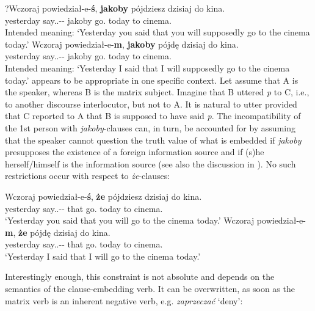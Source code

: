 \documentclass[output=paper
,modfonts
,nonflat]{langsci/langscibook}
\begin{document}
\ea \ea \gll	?Wczoraj powiedział-e-\textbf{ś}, \textbf{jakoby} pójdziesz dzisiaj do kina. \label{drugaosoba} \\
  			yesterday say.{\lptcp}.{\sg}-{\masc}-{\secondperson}{\sg} jakoby go.{\secondperson}{\sg} today to cinema.{\gen} \\
	\glt		Intended meaning: `Yesterday you said that  you will supposedly go to the cinema today.'
		\ex \gll	*Wczoraj powiedział-e-\textbf{m}, \textbf{jakoby} pójdę dzisiaj do kina. \label{pierwszy} \\
  			yesterday say.{\lptcp}.{\sg}-{\masc}-{\firstperson}{\sg} jakoby go.{\firstperson}{\sg} today to cinema.{\gen}\\
	\glt		Intended meaning: `Yesterday I said that I will supposedly go to the cinema today.'
\z\z
{} appears to be appropriate in one specific context. Let assume that A is the speaker, whereas B is the matrix subject. Imagine that B uttered \emph{p} to C, i.e., to another discourse interlocutor, but not to A. It is natural to utter  provided that C reported to A that B is supposed to have said \emph{p}. The incompatibility of the 1st person with \emph{jakoby}-clauses can, in turn, be accounted for by assuming that the speaker cannot question the truth value of what is embedded if \emph{jakoby} presupposes the existence of a foreign information source and if (s)he herself\slash himself is the information source (see also the discussion in \cite{Curnow2002}). No such restrictions occur with respect to \emph{że}-clauses:

 \ea \ea \gll Wczoraj powiedział-e-\textbf{ś}, \textbf{że} pójdziesz dzisiaj do kina. \\
  			yesterday say.{\lptcp}.{\sg}-{\masc}-{\secondperson}{\sg} that go.{\secondperson}{\sg} today to cinema.{\gen} \\
	\glt		`Yesterday you said that you will go to the cinema today.'
	\ex \gll Wczoraj powiedział-e-\textbf{m}, \textbf{że} pójdę dzisiaj do kina. \\
  			yesterday say.{\lptcp}.{\sg}-{\masc}-{\firstperson}{\sg} that go.{\firstperson}{\sg} today to cinema.{\gen} \\
    \glt `Yesterday I said that I will go to the cinema today.'      
\z
\z

Interestingly enough, this constraint is not absolute and depends on the semantics of the clause-embedding verb. It can be overwritten, as soon as the matrix verb is an inherent negative verb, e.g. \emph{zaprzeczać} `deny':
\end{document}
